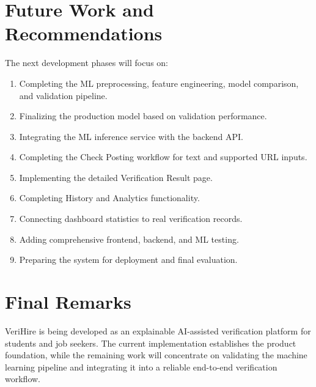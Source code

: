 \documentclass[12pt,a4paper]{report}
\begin{document}
\section{Future Work and Recommendations}

The next development phases will focus on:

\begin{enumerate}

    \item Completing the ML preprocessing, feature engineering, model comparison, and validation pipeline.

    \item Finalizing the production model based on validation performance.

    \item Integrating the ML inference service with the backend API.

    \item Completing the Check Posting workflow for text and supported URL inputs.

    \item Implementing the detailed Verification Result page.

    \item Completing History and Analytics functionality.

    \item Connecting dashboard statistics to real verification records.

    \item Adding comprehensive frontend, backend, and ML testing.

    \item Preparing the system for deployment and final evaluation.

\end{enumerate}


\section{Final Remarks}

VeriHire is being developed as an explainable AI-assisted verification platform for students and job seekers. The current implementation establishes the product foundation, while the remaining work will concentrate on validating the machine learning pipeline and integrating it into a reliable end-to-end verification workflow.
\end{document}
